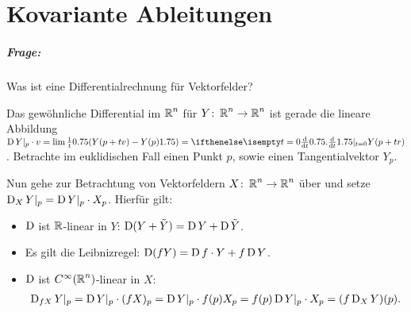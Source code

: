 
\chapter{Kovariante Ableitungen}

\paragraph{Frage:} Was ist eine  Differentialrechnung für Vektorfelder?

Das gewöhnliche Differential im $\operatorname{\mathbb{R}}^n$ für $Y \colon \operatorname{\mathbb{R}}^n \to \operatorname{\mathbb{R}}^n$ ist gerade die lineare Abbildung $\D Y|_p \cdot v = \lim \frac{1}t \left(Y(p+tv) -Y(p)\right) = \difffrac[t=0]{}{t} Y(p+tr)$.
Betrachte im euklidischen Fall einen Punkt $p$, sowie einen Tangentialvektor $Y_p$.
\begin{center}\end{center}

Nun gehe zur Betrachtung von Vektorfeldern $X \colon \operatorname{\mathbb{R}}^n \to \operatorname{\mathbb{R}}^n$ über und setze $\operatorname{D}_XY|_p = \operatorname{D} Y|_p\cdot X_p$. Hierfür gilt:
\begin{itemize}
\item $\operatorname{D}$ ist $\operatorname{\mathbb{R}}$-linear in $Y$: $\operatorname{D}(Y + \tilde Y) = \operatorname{D} Y + \operatorname{D} \tilde Y$.
\item Es gilt die Leibnizregel: $\operatorname{D}(fY) = \operatorname{D} f \cdot Y + f\operatorname{D} Y$.
\item $\operatorname{D}$ ist $C^{\infty}(\operatorname{\mathbb{R}}^n)$-linear in $X$:
  \begin{align*}
    \operatorname{D}_{fX}Y|_p = \operatorname{D} Y|_p\cdot(fX)_p = \operatorname{D} Y|_p \cdot f(p)X_p = f(p) \operatorname{D} Y|_p \cdot X_p = (f \operatorname{D}_XY)(p).
  \end{align*}
\end{itemize}

